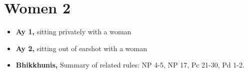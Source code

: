 \chapter{Women 2}

\begin{itemize}
\tightlist
\item
  \textbf{Ay 1,} sitting privately with a woman
\item
  \textbf{Ay 2,} sitting out of earshot with a woman
\item
  \textbf{Bhikkhunis,} Summary of related rules: NP 4-5, NP 17, Pc
  21-30, Pd 1-2.
\end{itemize}


